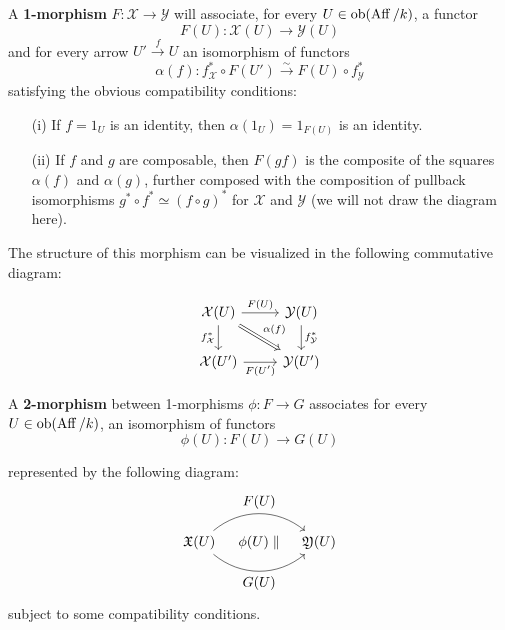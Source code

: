 \documentclass[12pt]{article}
\begin{document}
\begin{definition}
    A \textbf{1-morphism} \( F : \mathcal{X} \to \mathcal{Y} \) will associate, for every \( U \in \operatorname{ob}(\operatorname{Aff}/k) \), a functor
    \[
        F(U) : \mathcal{X}(U) \to \mathcal{Y}(U)
    \]
    and for every arrow \( U' \xrightarrow{f} U \) an isomorphism of functors
    \[
        \alpha(f) : f_{\mathcal{X}}^* \circ F(U') \xrightarrow{\sim} F(U) \circ f_{\mathcal{Y}}^*
    \]
    satisfying the obvious compatibility conditions:

    \begin{enumerate}
        \item[(i)] If \( f = 1_U \) is an identity, then \( \alpha(1_U) = 1_{F(U)} \) is an identity.
        \item[(ii)] If \( f \) and \( g \) are composable, then \( F(gf) \) is the composite of the squares \( \alpha(f) \) and \( \alpha(g) \), further composed with the composition of pullback isomorphisms \( g^* \circ f^* \simeq (f \circ g)^* \) for \( \mathcal{X} \) and \( \mathcal{Y} \) (we will not draw the diagram here).
    \end{enumerate}

    The structure of this morphism can be visualized in the following commutative diagram:

    \[
        \begin{tikzcd}
            \mathcal{X}(U) \arrow[r, "F(U)"]\arrow[rd, "\alpha(f)", Rightarrow]  \arrow[d, "f_{\mathcal{X}}^*"'] & \mathcal{Y}(U) \arrow[d, "f_{\mathcal{Y}}^*"] \\
            \mathcal{X}(U') \arrow[r, "F(U')"'] & \mathcal{Y}(U')
        \end{tikzcd}
    \]


    A \textbf{2-morphism} between 1-morphisms \( \phi : F \to G \) associates for every \( U \in \operatorname{ob}(\operatorname{Aff}/k) \), an isomorphism of functors
    \[
        \phi(U) : F(U) \to G(U)
    \]

    represented by the following diagram:
    \[
        \begin{tikzpicture}
            \node (X) at (0,0) {$\mathfrak{X}(U)$};
            \node (Y) at (3,0) {$\mathfrak{Y}(U)$};

            \draw[->] (X) to[bend left=40] node[above] {$F(U)$} (Y);

            \draw[->] (X) to[bend right=40] node[below] {$G(U)$} (Y);

            \node at (1.5,0) {$\phi(U)\parallel$};
        \end{tikzpicture}
    \]
    subject to some compatibility conditions.
\end{definition}
\end{document}
